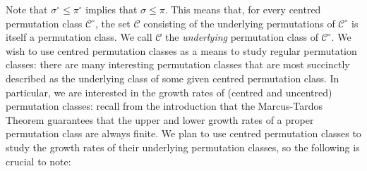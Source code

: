 \documentclass[11pt,a4paper]{article}
\theoremstyle{definition}
\begin{document}
Note that $\sigma^{\circ} \leq \pi^{\circ}$ implies that $\sigma \leq \pi$. This means that, for every centred permutation class $\mathcal{C}^{\circ}$, the set $\mathcal{C}$ consisting of the underlying permutations of $\mathcal{C}^{\circ}$ is itself a permutation class. We call $\mathcal{C}$ the \emph{underlying} permutation class of $\mathcal{C}^{\circ}$. We wish to use centred permutation classes as a means to study regular permutation classes: there are many interesting permutation classes that are most succinctly described as the underlying class of some given centred permutation class. In particular, we are interested in the growth rates of (centred and uncentred) permutation classes: recall from the introduction that the Marcus-Tardos Theorem guarantees that the upper and lower growth rates of a proper permutation class are always finite. We plan to use centred permutation classes to study the growth rates of their underlying permutation classes, so the following is crucial to note:
\end{document}

